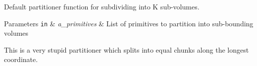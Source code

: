 Default partitioner function for subdividing into K sub-\/volumes. 


\begin{DoxyParams}[1]{Parameters}
\mbox{\tt in}  & {\em a\+\_\+primitives} & List of primitives to partition into sub-\/bounding volumes\\
\hline
\end{DoxyParams}
This is a very stupid partitioner which splits into equal chunks along the longest coordinate. 